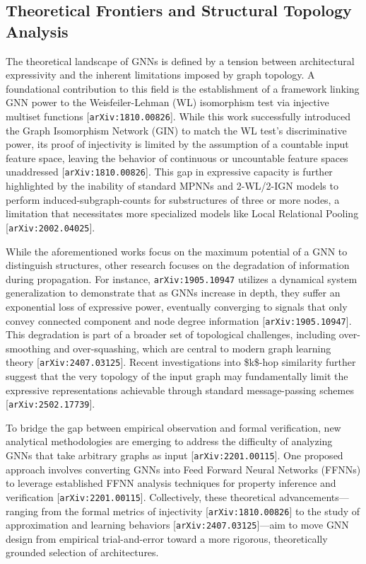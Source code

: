 \documentclass[11pt]{article}
\begin{document}
\subsection{Theoretical Frontiers and Structural Topology Analysis}

The theoretical landscape of GNNs is defined by a tension between architectural expressivity and the inherent limitations imposed by graph topology. A foundational contribution to this field is the establishment of a framework linking GNN power to the Weisfeiler-Lehman (WL) isomorphism test via injective multiset functions [\texttt{arXiv:1810.00826}]. While this work successfully introduced the Graph Isomorphism Network (GIN) to match the WL test's discriminative power, its proof of injectivity is limited by the assumption of a countable input feature space, leaving the behavior of continuous or uncountable feature spaces unaddressed [\texttt{arXiv:1810.00826}]. This gap in expressive capacity is further highlighted by the inability of standard MPNNs and 2-WL/2-IGN models to perform induced-subgraph-counts for substructures of three or more nodes, a limitation that necessitates more specialized models like Local Relational Pooling [\texttt{arXiv:2002.04025}].

While the aforementioned works focus on the maximum potential of a GNN to distinguish structures, other research focuses on the degradation of information during propagation. For instance, \texttt{arXiv:1905.10947} utilizes a dynamical system generalization to demonstrate that as GNNs increase in depth, they suffer an exponential loss of expressive power, eventually converging to signals that only convey connected component and node degree information [\texttt{arXiv:1905.10947}]. This degradation is part of a broader set of topological challenges, including over-smoothing and over-squashing, which are central to modern graph learning theory [\texttt{arXiv:2407.03125}]. Recent investigations into \$k\$-hop similarity further suggest that the very topology of the input graph may fundamentally limit the expressive representations achievable through standard message-passing schemes [\texttt{arXiv:2502.17739}].

To bridge the gap between empirical observation and formal verification, new analytical methodologies are emerging to address the difficulty of analyzing GNNs that take arbitrary graphs as input [\texttt{arXiv:2201.00115}]. One proposed approach involves converting GNNs into Feed Forward Neural Networks (FFNNs) to leverage established FFNN analysis techniques for property inference and verification [\texttt{arXiv:2201.00115}]. Collectively, these theoretical advancements—ranging from the formal metrics of injectivity [\texttt{arXiv:1810.00826}] to the study of approximation and learning behaviors [\texttt{arXiv:2407.03125}]—aim to move GNN design from empirical trial-and-error toward a more rigorous, theoretically grounded selection of architectures.
\end{document}
